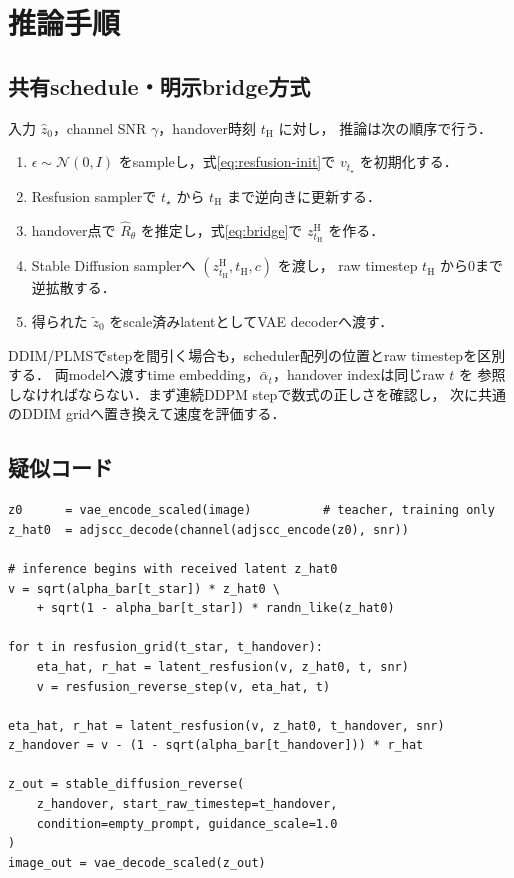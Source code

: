 \documentclass[11pt,a4paper]{ltjsarticle}
\newcommand{\N}{\mathcal{N}}
\begin{document}
\section{推論手順}

\subsection{共有schedule・明示bridge方式}

入力 \(\hat z_0\)，channel SNR \(\gamma\)，handover時刻 \(t_{\mathrm H}\) に対し，
推論は次の順序で行う．
\begin{enumerate}
  \item \(\epsilon\sim\N(0,I)\) をsampleし，式\eqref{eq:resfusion-init}で
        \(v_{t_\star}\) を初期化する．
  \item Resfusion samplerで \(t_\star\) から \(t_{\mathrm H}\) まで逆向きに更新する．
  \item handover点で \(\hat R_\theta\) を推定し，式\eqref{eq:bridge}で
        \(z^{\mathrm H}_{t_{\mathrm H}}\) を作る．
  \item Stable Diffusion samplerへ
        \((z^{\mathrm H}_{t_{\mathrm H}},t_{\mathrm H},c)\) を渡し，
        raw timestep \(t_{\mathrm H}\) から0まで逆拡散する．
  \item 得られた \(\tilde z_0\) をscale済みlatentとしてVAE decoderへ渡す．
\end{enumerate}

DDIM\cite{ddim}/PLMSでstepを間引く場合も，scheduler配列の位置とraw timestepを区別する．
両modelへ渡すtime embedding，\(\bar\alpha_t\)，handover indexは同じraw \(t\) を
参照しなければならない．まず連続DDPM stepで数式の正しさを確認し，
次に共通のDDIM gridへ置き換えて速度を評価する．

\subsection{疑似コード}

\begin{verbatim}
z0      = vae_encode_scaled(image)          # teacher, training only
z_hat0  = adjscc_decode(channel(adjscc_encode(z0), snr))

# inference begins with received latent z_hat0
v = sqrt(alpha_bar[t_star]) * z_hat0 \
    + sqrt(1 - alpha_bar[t_star]) * randn_like(z_hat0)

for t in resfusion_grid(t_star, t_handover):
    eta_hat, r_hat = latent_resfusion(v, z_hat0, t, snr)
    v = resfusion_reverse_step(v, eta_hat, t)

eta_hat, r_hat = latent_resfusion(v, z_hat0, t_handover, snr)
z_handover = v - (1 - sqrt(alpha_bar[t_handover])) * r_hat

z_out = stable_diffusion_reverse(
    z_handover, start_raw_timestep=t_handover,
    condition=empty_prompt, guidance_scale=1.0
)
image_out = vae_decode_scaled(z_out)
\end{verbatim}
\end{document}
